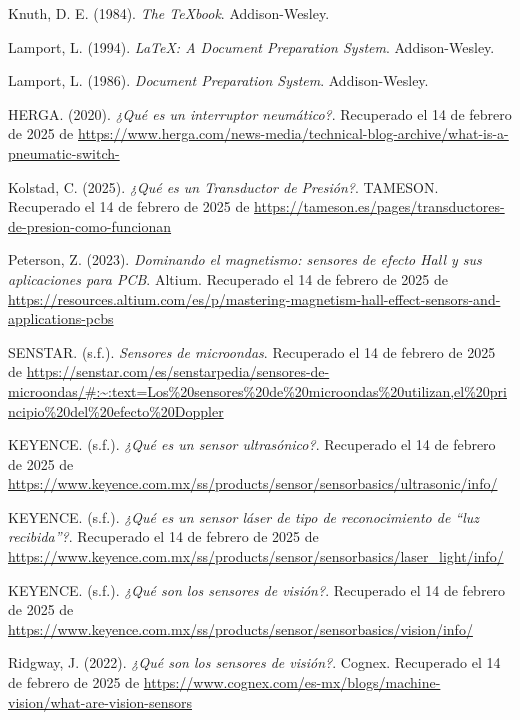 \begin{thebibliography}{99}
	
	Knuth, D. E. (1984). 
	\textit{The TeXbook}. Addison-Wesley.
	
	Lamport, L. (1994). 
	\textit{LaTeX: A Document Preparation System}. Addison-Wesley.
	

	
	Lamport, L. (1986). 
	\textit{Document Preparation System}. Addison-Wesley.
	
	HERGA. (2020). 
	\textit{¿Qué es un interruptor neumático?}. Recuperado el 14 de febrero de 2025 de \url{https://www.herga.com/news-media/technical-blog-archive/what-is-a-pneumatic-switch-}
	
	Kolstad, C. (2025). 
	\textit{¿Qué es un Transductor de Presión?}. TAMESON. Recuperado el 14 de febrero de 2025 de \url{https://tameson.es/pages/transductores-de-presion-como-funcionan}
	
	Peterson, Z. (2023). 
	\textit{Dominando el magnetismo: sensores de efecto Hall y sus aplicaciones para PCB}. Altium. Recuperado el 14 de febrero de 2025 de \url{https://resources.altium.com/es/p/mastering-magnetism-hall-effect-sensors-and-applications-pcbs}
	
	SENSTAR. (s.f.). 
	\textit{Sensores de microondas}. Recuperado el 14 de febrero de 2025 de \url{https://senstar.com/es/senstarpedia/sensores-de-microondas/#:~:text=Los%20sensores%20de%20microondas%20utilizan,el%20principio%20del%20efecto%20Doppler}
	
	KEYENCE. (s.f.). 
	\textit{¿Qué es un sensor ultrasónico?}. Recuperado el 14 de febrero de 2025 de \url{https://www.keyence.com.mx/ss/products/sensor/sensorbasics/ultrasonic/info/}
	
	KEYENCE. (s.f.). 
	\textit{¿Qué es un sensor láser de tipo de reconocimiento de “luz recibida”?}. Recuperado el 14 de febrero de 2025 de \url{https://www.keyence.com.mx/ss/products/sensor/sensorbasics/laser_light/info/}
	
	KEYENCE. (s.f.). 
	\textit{¿Qué son los sensores de visión?}. Recuperado el 14 de febrero de 2025 de \url{https://www.keyence.com.mx/ss/products/sensor/sensorbasics/vision/info/}
	
	Ridgway, J. (2022). 
	\textit{¿Qué son los sensores de visión?}. Cognex. Recuperado el 14 de febrero de 2025 de \url{https://www.cognex.com/es-mx/blogs/machine-vision/what-are-vision-sensors}
	
	
\end{thebibliography}

